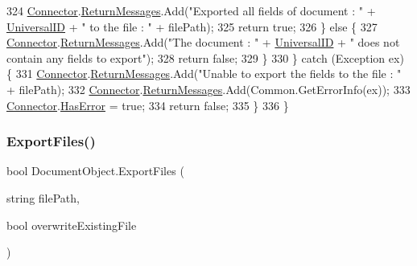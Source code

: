 \begin{DoxyCode}
324                 \mbox{\hyperlink{class_connector}{Connector}}.\mbox{\hyperlink{class_connector_a1ed422674b344524fd77998dcf6a9ba6}{ReturnMessages}}.Add(\textcolor{stringliteral}{"Exported all fields of document : "} + 
      \mbox{\hyperlink{class_document_object_a8b96d04632a2802e7cc5466ca5cee8cf}{UniversalID}} + \textcolor{stringliteral}{" to the file : "} + filePath);
325                 \textcolor{keywordflow}{return} \textcolor{keyword}{true};
326             \} \textcolor{keywordflow}{else} \{
327                 \mbox{\hyperlink{class_connector}{Connector}}.\mbox{\hyperlink{class_connector_a1ed422674b344524fd77998dcf6a9ba6}{ReturnMessages}}.Add(\textcolor{stringliteral}{"The document : "} + 
      \mbox{\hyperlink{class_document_object_a8b96d04632a2802e7cc5466ca5cee8cf}{UniversalID}} + \textcolor{stringliteral}{" does not contain any fields to export"});
328                 \textcolor{keywordflow}{return} \textcolor{keyword}{false};
329             \}
330         \} \textcolor{keywordflow}{catch} (Exception ex) \{
331             \mbox{\hyperlink{class_connector}{Connector}}.\mbox{\hyperlink{class_connector_a1ed422674b344524fd77998dcf6a9ba6}{ReturnMessages}}.Add(\textcolor{stringliteral}{"Unable to export the fields to the file : 
      "} + filePath);
332             \mbox{\hyperlink{class_connector}{Connector}}.\mbox{\hyperlink{class_connector_a1ed422674b344524fd77998dcf6a9ba6}{ReturnMessages}}.Add(Common.GetErrorInfo(ex));
333             \mbox{\hyperlink{class_connector}{Connector}}.\mbox{\hyperlink{class_connector_a9365777a6b7b711b75bcfa6c4d53e989}{HasError}} = \textcolor{keyword}{true};
334             \textcolor{keywordflow}{return} \textcolor{keyword}{false};
335         \}
336     \}
\end{DoxyCode}
\mbox{\label{class_document_object_a8753abc5a871bf84fc910e6a99936b2b}} 
\subsubsection{\texorpdfstring{Export\+Files()}{ExportFiles()}}
{\footnotesize\ttfamily bool Document\+Object.\+Export\+Files (\begin{DoxyParamCaption}\item[{string}]{file\+Path,  }\item[{bool}]{overwrite\+Existing\+File }\end{DoxyParamCaption})}



